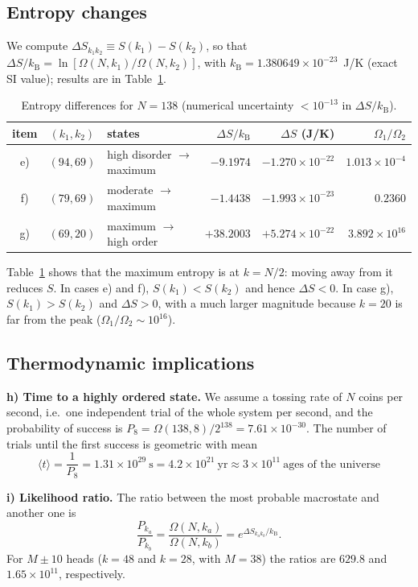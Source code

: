 \documentclass[11pt,a4paper]{article}
\newcommand{\kB}{k_{\mathrm B}}
\newcommand{\Om}{\Omega}
\begin{document}
\subsection{Entropy changes}
We compute $\Delta S_{k_1k_2}\equiv S(k_1)-S(k_2)$, so that $\Delta S/\kB=\ln[\Om(N,k_1)/\Om(N,k_2)]$, with $\kB=1.380649\times10^{-23}$~J/K (exact SI value); results are in Table~\ref{tab:entropy}.
\begin{table}[H]
\centering\small
\begin{tabular}{@{}cclrrr@{}}
\toprule
item & $(k_1,k_2)$ & states & $\Delta S/\kB$ & $\Delta S$ (J/K) & $\Om_1/\Om_2$ \\ \midrule
e) & $(94,69)$ & high disorder $\to$ maximum & $-9.1974$ & $-1.270\times10^{-22}$ & $1.013\times10^{-4}$ \\
f) & $(79,69)$ & moderate $\to$ maximum & $-1.4438$ & $-1.993\times10^{-23}$ & $0.2360$ \\
g) & $(69,20)$ & maximum $\to$ high order & $+38.2003$ & $+5.274\times10^{-22}$ & $3.892\times10^{16}$ \\ \bottomrule
\end{tabular}
\caption{Entropy differences for $N=138$ (numerical uncertainty $<10^{-13}$ in $\Delta S/\kB$).}
\label{tab:entropy}
\end{table}
Table~\ref{tab:entropy} shows that the maximum entropy is at $k=N/2$: moving away from it reduces $S$. In cases e) and f), $S(k_1)<S(k_2)$ and hence
$\Delta S<0$. In case g), $S(k_1)>S(k_2)$ and $\Delta S>0$, with a much larger magnitude because $k=20$ is far from the peak
($\Om_1/\Om_2\sim10^{16}$).

\subsection{Thermodynamic implications}\label{sec:thermo}
\textbf{h) Time to a highly ordered state.} We assume a tossing rate of $N$ coins per second, i.e.\ one independent trial of the whole system per second, and the probability of success is
$P_8=\Om(138,8)/2^{138}=7.61\times10^{-30}$. The number of trials until the first success is geometric with mean
\begin{equation}
  \langle t\rangle=\frac1{P_8}=1.31\times10^{29}\ \mathrm s=4.2\times10^{21}\ \mathrm{yr}\approx3\times10^{11}\ \text{ages of the universe}
\end{equation}

\textbf{i) Likelihood ratio.} The ratio between the most probable macrostate and another one is
\begin{equation}
\frac{P_{k_a}}{P_{k_b}}=\frac{\Om(N,k_a)}{\Om(N,k_b)}=e^{\Delta S_{k_ak_b}/\kB}.
\end{equation}
For $M\pm10$ heads ($k=48$ and $k=28$, with $M=38$) the ratios are $629.8$ and $1.65\times10^{11}$, respectively.
\end{document}
